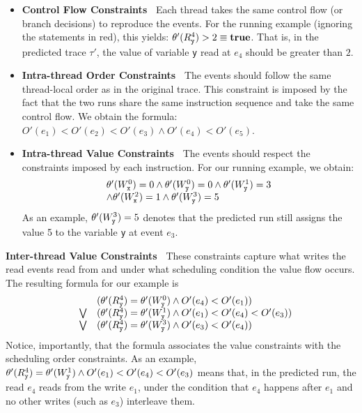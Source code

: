 \begin{itemize}
\item {\bf Control Flow Constraints\ } Each thread takes the same control flow
(or branch decisions) to reproduce the events.
 For the running example (ignoring the statements in red), this 
yields: $\theta'(R_{\tt y}^4) > 2 \equiv {\bf true}$.
That is, in the predicted trace $\tau'$, the value of variable {\tt y} 
read at $e_4$ should be greater than $2$. 


\item {\bf Intra-thread Order Constraints\ } The events should follow 
the same thread-local order as in the original trace. This constraint 
is imposed by the fact that the two runs share the same instruction 
sequence and take the same control flow. 
We obtain the  formula: $O'(e_1) < O'(e_2) < O'(e_3) \wedge O'(e_4) < O'(e_5)$.

\item {\bf Intra-thread Value Constraints\ } The events should respect the 
constraints imposed by each instruction.
 For our running example, we obtain:
$$
\begin{array}{l}
	\theta'(W_{\tt x}^0) = 0 \wedge \theta'(W_{\tt y}^0) = 0 \wedge \theta'(W_{\tt y}^1) = 3 \\ 
	\wedge	\theta'(W_{\tt x}^2) = 1 \wedge \theta'(W_{\tt y}^3) = 5
	\end{array}
$$
As an example, $\theta'(W_{\tt y}^3)= 5$ denotes that the predicted run still assigns the value 5 to the variable {\tt y}  at event $e_3$.
\end{itemize}





{\bf Inter-thread Value Constraints\ } These constraints capture what writes the read events read from and under what scheduling condition the value flow occurs.  The resulting formula for our example is
$$
\begin{array}{lcl}
	& & (\theta'(R_{\tt y}^4)=\theta'(W_{\tt y}^0) \wedge O'(e_4) < O'(e_1) ) \\
& \bigvee &
	(\theta'(R_{\tt y}^4)=\theta'(W_{\tt y}^1) \wedge O'(e_1) < O'(e_4) < O'(e_3)) \\
& \bigvee &
	(\theta'(R_{\tt y}^4)=\theta'(W_{\tt y}^3) \wedge O'(e_3) < O'(e_4))
\end{array}
$$    
Notice, importantly, that the formula associates the value constraints 
with the scheduling order constraints. 
As an example, 
$\theta'(R_{\tt y}^4)=\theta'(W_{\tt y}^1) \wedge O'(e_1) < O'(e_4) < O'(e_3)$ 
means that, in the predicted run, the read $e_4$ reads from the write $e_1$, 
under the condition that $e_4$ happens after $e_1$ and no other  
writes (such as $e_3$) interleave them.


